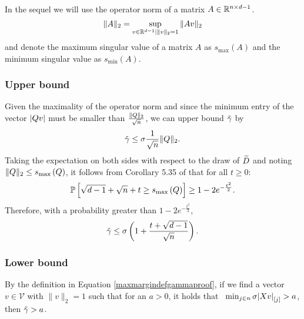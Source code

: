 In the sequel we will use the operator norm of a matrix $A \in \mathbb{R}^{n \times d-1}$.
\begin{equation*}
\| A\|_2 = \sup_{v \in \mathbb{R}^{d-1} \mid \|v\|_2=1} \|A v \|_2
\end{equation*}
and denote the maximum singular value of a matrix $A$ as $s_{\text{max}} (A)$ and the minimum singular value as $s_{\text{min}}(A)$.

\subsubsection{Upper bound}
\label{sec:gammaupperbound}


Given the maximality of the
operator norm and since the minimum entry of the vector
$|Q v|$ must be smaller than $\frac{\|Q\|_2}{\sqrt{n}}$, we can upper bound
$\tilde{\gamma}$ by
\begin{equation*}
\tilde{\gamma}  \leq \sigma  \frac{1}{\sqrt{n}} \|Q{}\|_2.
\end{equation*}
Taking the expectation on both sides with respect to the draw of
$\widetilde{D}$ and noting $\|Q\|_2 \leq
s_{\text{max}}\left(Q\right)$,
it follows from
Corollary 5.35  of \cite{vershynin12} %
that for all $t\geq 0$:
\begin{equation*}
\mathbb{P} \left[\sqrt{d-1}+\sqrt{n}+t \geq s_{\text{max}}\left(Q\right) \right] \geq 1-2e^{-\frac{t^2}{2}}.
\end{equation*}
Therefore, with a probability greater than $1-2e^{-\frac{t^2}{2}}$,
\begin{equation*}
\tilde{\gamma} \leq  \sigma \left(1+ \frac{t+\sqrt{d-1}}{\sqrt{n}}\right).
\end{equation*}

\subsubsection{Lower bound}
\label{sec:gammalowerbound}
By the definition in Equation \eqref{maxmargindefgammaproof}, if we
find a vector $v \in \mathcal{V}$ with $\|v\|_2=1$ such that for an
$a>0$, it holds that $\hspace{0.5em} \min_{j \in n} \sigma
{|Xv|}_{[j]} > a$, then $\tilde{\gamma} > a$.

